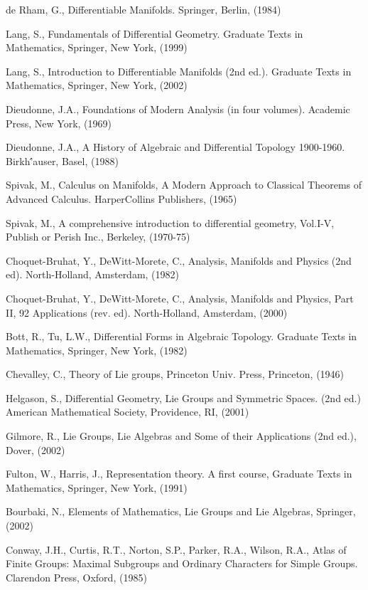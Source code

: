\documentclass[11pt,fontset=founder]{ctexart}
\begin{document}
\begin{thebibliography}{99}
 de Rham, G., Differentiable Manifolds. Springer, Berlin,
(1984)

 Lang, S., Fundamentals of Differential Geometry. Graduate
Texts in Mathematics, Springer, New York, (1999)

 Lang, S., Introduction to Differentiable Manifolds (2nd
ed.). Graduate Texts in Mathematics, Springer, New York, (2002)

 Dieudonne, J.A., Foundations of Modern Analysis (in four
volumes). Academic Press, New York, (1969)

 Dieudonne, J.A., A History of Algebraic and
Differential Topology 1900-1960. Birkh\'{'}auser, Basel, (1988)

 Spivak, M., Calculus on Manifolds, A Modern Approach to
Classical Theorems of Advanced Calculus. HarperCollins Publishers, (1965)

 Spivak, M., A comprehensive introduction to differential
geometry, Vol.I-V, Publish or Perish Inc., Berkeley, (1970-75)

 Choquet-Bruhat, Y., DeWitt-Morete, C., Analysis, Manifolds
and Physics (2nd ed). North-Holland, Amsterdam, (1982)

 Choquet-Bruhat, Y., DeWitt-Morete, C., Analysis, Manifolds
and Physics, Part II, 92 Applications (rev. ed). North-Holland, Amsterdam,
(2000)

 Bott, R., Tu, L.W., Differential Forms in Algebraic Topology.
Graduate Texts in Mathematics, Springer, New York, (1982)

 Chevalley, C., Theory of Lie groups, Princeton Univ.
Press, Princeton, (1946)

 Helgason, S., Differential Geometry, Lie Groups and
Symmetric Spaces. (2nd ed.) American Mathematical Society, Providence, RI,
(2001)

 Gilmore, R., Lie Groups, Lie Algebras and Some of their
Applications (2nd ed.), Dover, (2002)

 Fulton, W., Harris, J., Representation theory. A first
course, Graduate Texts in Mathematics, Springer, New York, (1991)

 Bourbaki, N., Elements of Mathematics, Lie Groups and Lie
Algebras, Springer, (2002)

 Conway, J.H., Curtis, R.T., Norton, S.P., Parker, R.A.,
Wilson, R.A., Atlas of Finite Groups: Maximal Subgroups and
Ordinary Characters for Simple Groups. Clarendon Press, Oxford, (1985)


\end{thebibliography}
\end{document}
